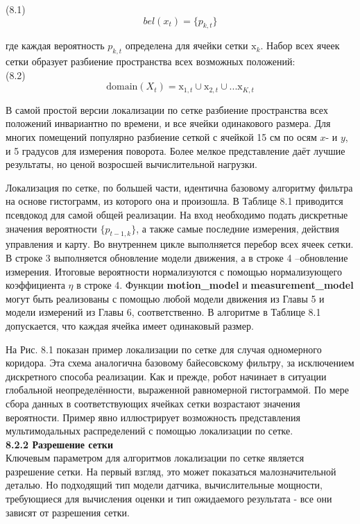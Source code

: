 \documentclass[10pt,a4paper]{article}
\begin{document}
(8.1)
$$bel(x_t)=\{p_{k,t}\}$$

где каждая вероятность $p_{k,t}$ определена для ячейки сетки $\text{x}_k$. Набор всех ячеек сетки образует разбиение пространства всех возможных положений:\\

(8.2)
$$\text{domain}(X_t)=\text{x}_{1,t}\cup\text{x}_{2,t}\cup...\text{x}_{K,t}$$

В самой простой версии локализации по сетке разбиение пространства всех положений инвариантно по времени, и все ячейки одинакового размера. Для многих помещений популярно разбиение сеткой с ячейкой 15 см по осям $x$- и $y$, и 5 градусов для измерения поворота. Более мелкое представление даёт лучшие результаты, но ценой возросшей вычислительной нагрузки.

Локализация по сетке, по большей части, идентична базовому алгоритму фильтра на основе гистограмм, из которого она и произошла. В Таблице 8.1 приводится псевдокод для самой общей реализации. На вход необходимо подать дискретные значения вероятности $\{p_{t-1,k}\}$, а также самые последние измерения, действия управления и карту. Во внутреннем цикле выполняется перебор всех ячеек сетки. В строке 3 выполняется обновление модели движения, а в строке 4 –обновление измерения. Итоговые вероятности нормализуются с помощью нормализующего коэффициента $\eta$ в строке 4. Функции \textbf{motion\_model} и \textbf{measurement\_model} могут быть реализованы с помощью любой модели движения из Главы 5 и модели измерений из Главы 6, соответственно. В алгоритме в Таблице 8.1 допускается, что каждая ячейка имеет одинаковый размер.

На Рис. 8.1 показан пример локализации по сетке для случая одномерного коридора. Эта схема аналогична базовому байесовскому фильтру, за исключением дискретного способа реализации. Как и прежде, робот начинает в ситуации глобальной неопределённости, выраженной равномерной гистограммой. По мере сбора данных в соответствующих ячейках сетки возрастают значения вероятности. Пример явно иллюстрирует возможность представления мультимодальных распределений с помощью локализации по сетке. \\

\textbf{8.2.2	Разрешение сетки}\\

Ключевым параметром для алгоритмов локализации по сетке является разрешение сетки. На первый взгляд, это может показаться малозначительной деталью. Но подходящий тип модели датчика, вычислительные мощности, требующиеся для вычисления оценки и тип ожидаемого результата - все они зависят от разрешения сетки.
\end{document}
